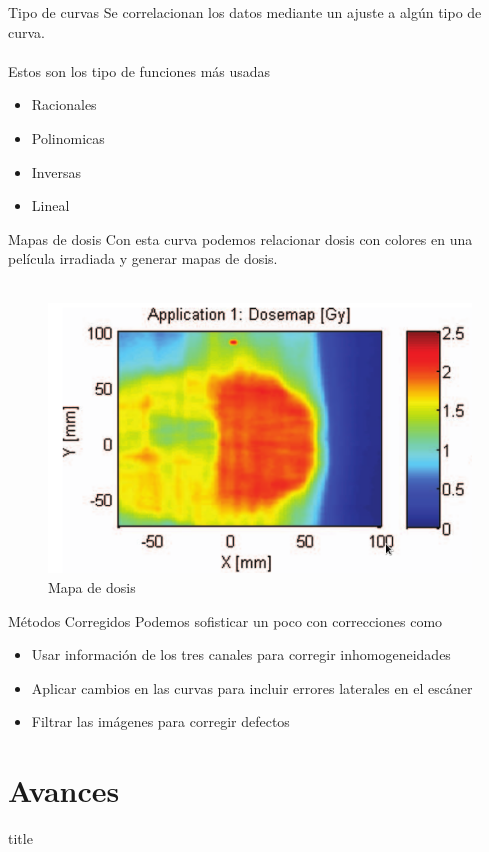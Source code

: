 \documentclass[12pt]{beamer}
\begin{document}
\begin{frame}{Tipo de curvas}
	Se correlacionan los datos mediante un ajuste a algún tipo de curva.\\~\\
	Estos son los tipo de funciones más usadas
	\begin{itemize}
		\item Racionales 
		\item Polinomicas
		\item Inversas
		\item Lineal
	\end{itemize}
\end{frame}

\begin{frame}{Mapas de dosis}
	Con esta curva podemos relacionar dosis con colores en una película irradiada y generar mapas de dosis.\\~\\
	\begin{figure}
		\centering
		\includegraphics[width=0.7\linewidth]{images/dosemap.png}
		\caption{Mapa de dosis \cite{Rink2008}}
	\end{figure}
\end{frame}


\begin{frame}{Métodos Corregidos}
Podemos sofisticar un poco con correcciones como 
\begin{itemize}
	\item Usar información de los tres canales para corregir inhomogeneidades
	\item Aplicar cambios en las curvas para incluir errores laterales en el escáner
	\item Filtrar las imágenes para corregir defectos
\end{itemize}
\end{frame}

\section{Avances}
\begin{frame}
	\vfill
	\centering
	\begin{beamercolorbox}[sep=8pt,center,shadow=true,rounded=true]{title}
		\insertsectionhead\par%
	\end{beamercolorbox}
	\vfill
\end{frame}
\end{document}
